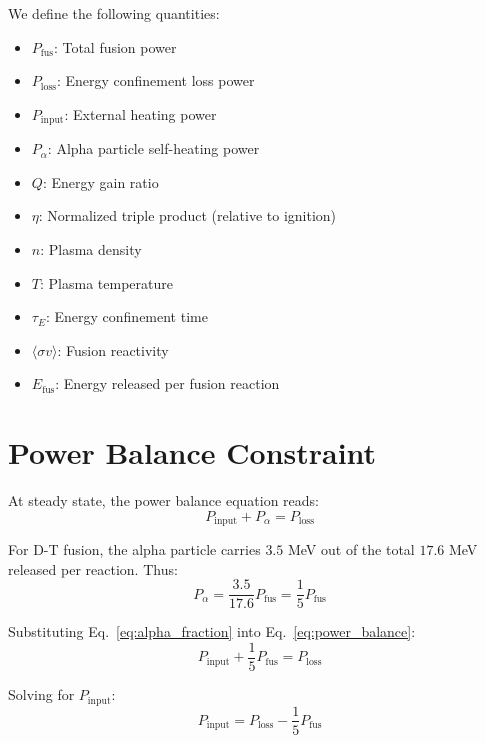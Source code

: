\documentclass[11pt,a4paper]{article}
\begin{document}
We define the following quantities:
\begin{itemize}
    \item $P_{\text{fus}}$: Total fusion power
    \item $P_{\text{loss}}$: Energy confinement loss power
    \item $P_{\text{input}}$: External heating power
    \item $P_\alpha$: Alpha particle self-heating power
    \item $Q$: Energy gain ratio
    \item $\eta$: Normalized triple product (relative to ignition)
    \item $n$: Plasma density
    \item $T$: Plasma temperature
    \item $\tau_E$: Energy confinement time
    \item $\langle\sigma v\rangle$: Fusion reactivity
    \item $E_{\text{fus}}$: Energy released per fusion reaction
\end{itemize}

\section{Power Balance Constraint}

At steady state, the power balance equation reads:
\begin{equation}
P_{\text{input}} + P_\alpha = P_{\text{loss}}
\label{eq:power_balance}
\end{equation}

For D-T fusion, the alpha particle carries $3.5$ MeV out of the total $17.6$ MeV released per reaction. Thus:
\begin{equation}
P_\alpha = \frac{3.5}{17.6} P_{\text{fus}} = \frac{1}{5} P_{\text{fus}}
\label{eq:alpha_fraction}
\end{equation}

Substituting Eq.~\eqref{eq:alpha_fraction} into Eq.~\eqref{eq:power_balance}:
\begin{equation}
P_{\text{input}} + \frac{1}{5} P_{\text{fus}} = P_{\text{loss}}
\end{equation}

Solving for $P_{\text{input}}$:
\begin{equation}
P_{\text{input}} = P_{\text{loss}} - \frac{1}{5} P_{\text{fus}}
\label{eq:P_input}
\end{equation}
\end{document}
